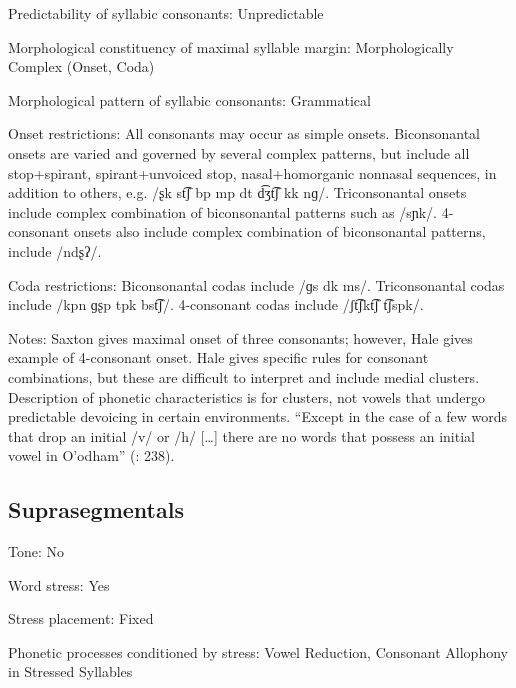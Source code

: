 {\begin{appendixdesc}
\item[Predictability of syllabic consonants:] Unpredictable

\item[Morphological constituency of maximal syllable margin:] Morphologically Complex (Onset, Coda)

\item[Morphological pattern of syllabic consonants:] Grammatical

\item[Onset restrictions:] All consonants may occur as simple onsets. Biconsonantal onsets are varied and governed by several complex patterns, but include all stop+spirant, spirant+unvoiced stop, nasal+homorganic nonnasal sequences, in addition to others, e.g. /ʂk st͡ʃ bp mp dt d͡ʒt͡ʃ kk nɡ/. Triconsonantal onsets include complex combination of biconsonantal patterns such as /sɲk/. 4-consonant onsets also include complex combination of biconsonantal patterns, include /ndʂʔ/.

\item[Coda restrictions:] Biconsonantal codas include /ɡs dk ms/. Triconsonantal codas include /kpn ɡʂp tpk bst͡ʃ/. 4-consonant codas include /ʃt͡ʃkt͡ʃ t͡ʃspk/.

\item[Notes:] Saxton gives maximal onset of three consonants; however, Hale gives example of 4-consonant onset. Hale gives specific rules for consonant combinations, but these are difficult to interpret and include medial clusters. Description of phonetic characteristics is for clusters, not vowels that undergo predictable devoicing in certain environments. “Except in the case of a few words that drop an initial /v/ or /h/ […] there are no words that possess an initial vowel in O’odham” (\citealt{DoloresMathiot1991}: 238).
\end{appendixdesc}
\subsection*{Suprasegmentals}
\begin{appendixdesc}
\item[Tone:] No

\item[Word stress:] Yes

\item[Stress placement:] Fixed

\item[Phonetic processes conditioned by stress:] Vowel Reduction, Consonant Allophony in Stressed Syllables


\end{appendixdesc}}
